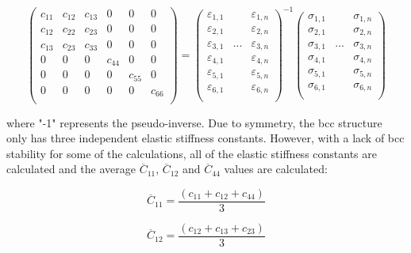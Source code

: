 \begin{equation}
\label{eq: hookes}
\begin{pmatrix}
	c_{11} & c_{12} & c_{13} & 0 & 0 & 0\\
	c_{12} & c_{22} & c_{23} & 0 & 0 & 0\\
	c_{13} & c_{23} & c_{33} & 0 & 0 & 0\\
	0 & 0 & 0 & c_{44} & 0 & 0\\
	0 & 0 & 0 & 0 &  c_{55} & 0\\
	0 & 0 & 0 & 0 & 0 & c_{66} \\    		
\end{pmatrix} =
\begin{pmatrix}
	\varepsilon_{1,1} & & \varepsilon_{1,n}\\
	\varepsilon_{2,1} & & \varepsilon_{2,n}\\
	\varepsilon_{3,1} & ... & \varepsilon_{3,n}\\
	\varepsilon_{4,1} & & \varepsilon_{4,n}\\
	\varepsilon_{5,1} & & \varepsilon_{5,n}\\
	\varepsilon_{6,1} & & \varepsilon_{6,n}\\					
\end{pmatrix}^{-1}
\begin{pmatrix}
	\sigma_{1,1} & & \sigma_{1,n}\\
	\sigma_{2,1} & & \sigma_{2,n}\\
	\sigma_{3,1} & ... & \sigma_{3,n}\\
	\sigma_{4,1} & & \sigma_{4,n}\\
	\sigma_{5,1} & & \sigma_{5,n}\\
	\sigma_{6,1} & & \sigma_{6,n}\\					
\end{pmatrix}
\end{equation}

\noindent where "-1" represents the pseudo-inverse. Due to symmetry, the bcc structure only has three independent elastic stiffness constants. However, with a lack of bcc stability for some of the calculations, all of the elastic stiffness constants are calculated and the average $\overline{C}_{11}$, $\overline{C}_{12}$ and $\overline{C}_{44}$ values are calculated:

\begin{equation}
\label{eq: averagec11}
\overline{C}_{11} = \frac{(c_{11} + c_{12} + c_{44})}{3}
\end{equation}

\begin{equation}
\label{eq: averagec12}
\overline{C}_{12} = \frac{(c_{12} + c_{13} + c_{23})}{3}
\end{equation}

